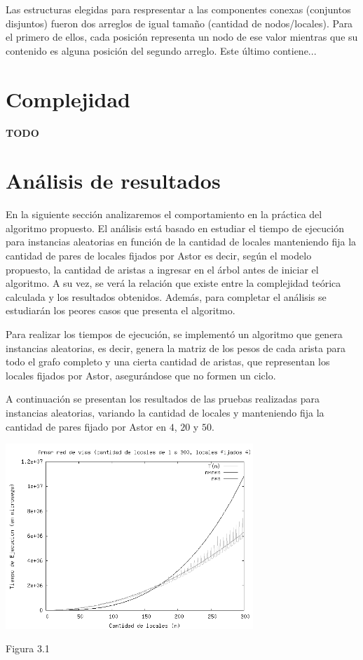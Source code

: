 \documentclass[a4paper,11pt] {article}
\begin{document}
Las estructuras elegidas para respresentar a las componentes conexas (conjuntos disjuntos) fueron dos arreglos de igual tamaño (cantidad de nodos/locales). Para el primero de ellos, cada posición representa un nodo de ese valor mientras que su contenido es alguna posición del segundo arreglo. Este último contiene...

\section*{Complejidad}

\textbf{TODO}

\section*{An\'alisis de resultados}

En la siguiente secci\'on analizaremos el comportamiento en la pr\'actica del algoritmo propuesto. El an\'alisis est\'a basado en estudiar el tiempo de ejecuci\'on para instancias aleatorias en funci\'on de la cantidad de locales manteniendo fija la cantidad de pares de locales fijados por Astor es decir, seg\'un el modelo propuesto, la cantidad de aristas a ingresar en el \'arbol antes de iniciar el algoritmo. A su vez, se ver\'a la relaci\'on que existe entre la complejidad te\'orica calculada y los resultados obtenidos. Adem\'as, para completar el an\'alisis se estudiar\'an los peores casos que presenta el algoritmo.

Para realizar los tiempos de ejecuci\'on, se implement\'o un algoritmo que genera instancias aleatorias, es decir, genera la matriz de los pesos de cada arista para todo el grafo completo y una cierta cantidad de aristas, que representan los locales fijados por Astor, asegur\'andose que no formen un ciclo.

A continuaci\'on se presentan los resultados de las pruebas realizadas para instancias aleatorias, variando la cantidad de locales y manteniendo fija la cantidad de pares fijado por Astor en $4$, $20$ y $50$.

\begin{center}
 \includegraphics[width=0.7\textwidth]{Plots/Tp2Ej3-Complejidad.png}
\begin{center}
Figura 3.1
\end{center}
\end{center}
\end{document}
